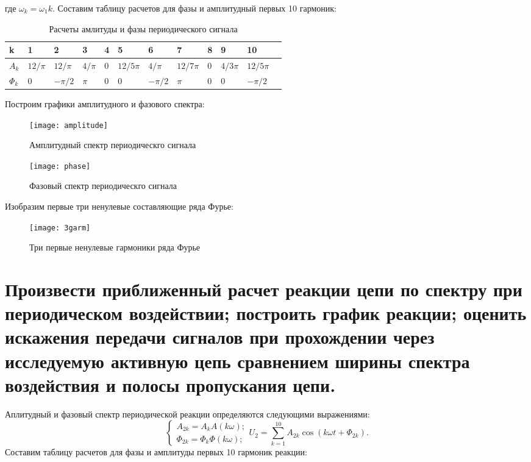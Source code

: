 \documentclass[a4paper,14pt ]{article} %
\begin{document}
    где $\omega_k = \omega_1 k$. Составим таблицу расчетов для фазы и амплитудный
    первых 10 гармоник:
    \begin{table*}[h!]
        \centering
        \begin{tabularx}{\linewidth} { | X | X | X | X | X | X | X | X | X | X | X | X |}
            \hline
            k & 1 & 2 & 3 & 4 & 5 & 6 & 7 & 8 & 9 & 10\\
            \hline
            $A_k$ & $12/\pi$ & $12/\pi$ & $4/\pi$ &0  & $12/5\pi$ & $4/\pi$& 
            $12/7\pi$ & 0 & $4/3\pi$ & $12/5\pi$ \\
            \hline
            $\Phi_k$ & 0 & $ -\pi/2 $ & $\pi$ & 0 & 0 & $-\pi/2$ & $\pi$ & 0 & 0 & $-\pi/2$\\
            \hline
        \end{tabularx}
        \caption{Расчеты амлитуды и фазы периодического сигнала}
        \label{table:2}
    \end{table*}
    
    Построим графики амплитудного и фазового спектра:
    \begin{figure}[H]
        \centering
        \texttt{[image: amplitude]}
        \caption{Амплитудный спектр периодическго сигнала}
        \label{fig:7}
    \end{figure}
    \begin{figure}[H]
        \centering
        \texttt{[image: phase]}
        \caption{Фазовый спектр периодическго сигнала}
        \label{fig:8}
    \end{figure}
    Изобразим первые три ненулевые составляющие ряда Фурье:
    \begin{figure}[H]
        \centering
        \texttt{[image: 3garm]}
        \caption{Три первые ненулевые гармоники ряда Фурье}
        \label{fig:8}
    \end{figure}
\section{Произвести приближенный расчет реакции цепи по спектру при периодическом воздействии; построить график реакции; оценить искажения передачи сигналов при прохождении через исследуемую активную цепь сравнением ширины спектра воздействия и полосы пропускания цепи.}
Аплитудный и фазовый спектр периодической реакции определяются следующими
выражениями:
\begin{equation}
    \begin{cases}
        A_{2k} = A_k A(k\omega);\\
        \Phi_{2k} = \Phi_k \Phi(k\omega);
    \end{cases}
    U_2 = \sum_{k=1}^{10}A_{2k}\cos(k\omega t + \Phi_{2k}).
\end{equation}
 Составим таблицу расчетов для фазы и амплитуды первых 10 гармоник реакции:
\end{document}
